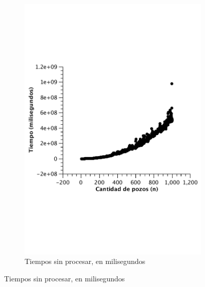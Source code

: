 \begin{figure}[H]
        \centering
\begin{subfigure}[b]{0.5\textwidth}
                \includegraphics[width=\textwidth]{imagenes/ej3-peor.pdf}
                \caption{Tiempos sin procesar, en milisegundos}
        \end{subfigure}%


\end{figure}
